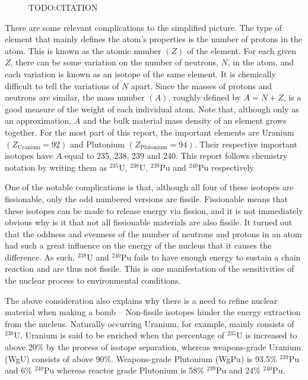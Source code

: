 \documentclass[twoside,titlepage,11pt,twocolumn,a4paper]{article}
\begin{document}
\begin{figure}
  \caption{TODO:CITATION}
  \label{nuclearBindingEnergyBowl}
\end{figure}

There are some relevant complications to the simplified picture. The
type of element that mainly defines the atom's properties is the
number of protons in the atom. This is known as the atomic number \(
\left ( Z \right ) \) of the element. For each given \(Z\), there can
be some variation on the number of neutrons, \(N\), in the atom, and
each variation is known as an isotope of the same element. It is
chemically difficult to tell the variations of \(N\) apart. Since the
masses of protons and neutrons are similar, the mass number \( \left (
A \right ) \), roughly defined by \(A=N+Z\), is a good measure of the
weight of each individual atom. Note that, although only as an
approximation, \(A\) and the bulk material mass density of an element
grows together. For the most part of this report, the important
elements are Uranium \( \left ( Z_{\textrm{Uranium}} = 92 \right ) \)
and Plutonium \( \left ( Z_{\textrm{Plutonium}} = 94 \right )
\). Their respective important isotopes have \(A\) equal to 235, 238,
239 and 240. This report follows chemistry notation by writing them as
\( \mathrm{^{235}U} \), \( \mathrm{^{238}U} \), \( \mathrm{^{239}Pu}
\) and \( \mathrm{^{240}Pu} \) respectively.

One of the notable complications is that, although all four of these
isotopes are fissionable, only the odd numbered versions are
fissile. Fissionable means that these isotopes can be made to release
energy via fission, and it is not immediately obvious why is it that
not all fissionable materials are also fissile. It turned out that the
oddness and evenness of the number of neutrons and protons in an atom
had such a great influence on the energy of the nucleus that it causes
the difference. As such, \( \mathrm{^{238}U} \) and \(
\mathrm{^{240}Pu} \) fails to have enough energy to sustain a chain
reaction and are thus not fissile. This is one manifestation of the
sensitivities of the nuclear process to environmental conditions.

The above consideration also explains why there is a need to refine
nuclear material when making a bomb -- Non-fissile isotopes hinder the
energy extraction from the nucleus. Naturally occurring Uranium, for
example, mainly consists of \( \mathrm{^{238}U} \).  Uranium is said
to be enriched when the percentage of \( \mathrm{^{235}U} \) is
increased to above 20\% by the process of isotope separation, whereas
weapons-grade Uranium (WgU) consists of above
90\%. \citep{blackmarket} Weapons-grade Plutonium (WgPu) is 93.5\% \(
\mathrm{^{239}Pu} \) and 6\% \( \mathrm{^{240}Pu} \) whereas reactor
grade Plutonium is 58\% \( \mathrm{^{239}Pu} \) and 24\% \(
\mathrm{^{240}Pu} \). \citep{drell1993}
\end{document}

